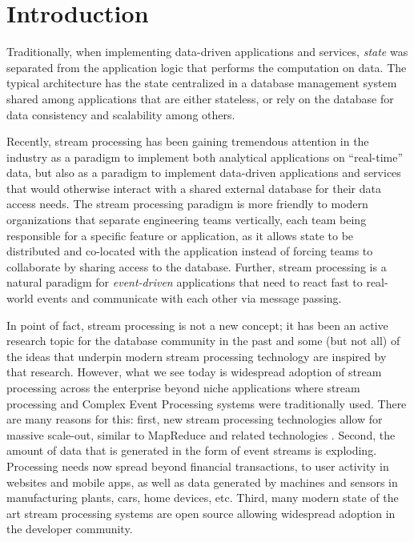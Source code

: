 
\section{Introduction}
\label{sec:intro}

Traditionally, when implementing data-driven applications and services, \emph{state} was separated from the application logic that performs the computation on data. The typical architecture has the state centralized in a database management system shared among applications that are either stateless, or rely on the database for data consistency and scalability among others.

Recently, stream processing has been gaining tremendous attention in the industry as a paradigm to implement both analytical applications on ``real-time'' data, but also as a paradigm to implement data-driven applications and services that would otherwise interact with a shared external database for their data access needs. The stream processing paradigm is more friendly to modern organizations that separate engineering teams vertically, each team being responsible for a specific feature or application, as it allows state to be distributed and co-located with the application instead of forcing teams to collaborate by sharing access to the database. Further, stream processing is a natural paradigm for \emph{event-driven} applications that need to react fast to real-world events and communicate with each other via message passing. 

In point of fact, stream processing is not a new concept; it has been an active research topic for the database community in the past \cite{cherniack2003scalable,chandrasekaran2003telegraphcq,abadi2003aurora,arasu2004stream} and some (but not all) of the ideas that underpin modern stream processing technology are inspired by that research. However, what we see today is widespread adoption of stream processing across the enterprise beyond niche applications where stream processing and Complex Event Processing systems were traditionally used. There are many reasons for this: first, new stream processing technologies allow for massive scale-out, similar to MapReduce \cite{dean2008mapreduce} and related technologies \cite{zaharia2010spark,stratosphere,battre2010nephele}. Second, the amount of data that is generated in the form of event streams is exploding. Processing needs now spread beyond financial transactions, to user activity in websites and mobile apps, as well as data generated by machines and sensors in manufacturing plants, cars, home devices, etc. Third, many modern state of the art stream processing systems are open source allowing widespread adoption in the developer community. 

